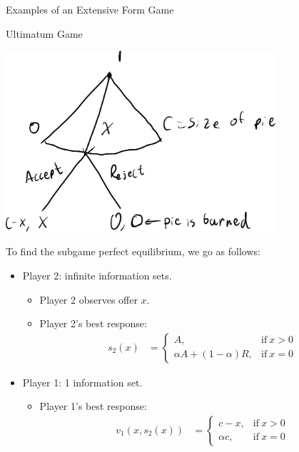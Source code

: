 \documentclass[8pt]{extarticle}
\begin{document}
  \begin{problem}{Examples of an Extensive Form Game}
    \begin{problem}{Ultimatum Game}
      \begin{center}
        \includegraphics[width=10cm]{images/ultimatum.png}
      \end{center}
      \tcblower
      To find the subgame perfect equilibrium, we go as follows:
      \begin{itemize}
        \item Player 2: infinite information sets.
          \begin{itemize}
            \item Player 2 observes offer $x$.
            \item Player 2's best response:
              \begin{align*}
                s_2(x) &= \begin{cases}
                  A,&\text{if}~x>0\\
                  \alpha A + (1-\alpha)R,&\text{if}~x=0 \tag*{$\forall \alpha\in[0,1]$}
                \end{cases}
              \end{align*}
          \end{itemize}
        \item Player 1: 1 information set.
          \begin{itemize}
            \item Player 1's best response:
              \begin{align*}
                v_1(x,s_2(x)) &= \begin{cases}
                  c-x,&\text{if}~x>0\\
                  \alpha c,&\text{if}~x=0
                \end{cases}
              \end{align*}

\end{itemize}
\end{itemize}
\end{problem}
\end{problem}
\end{document}
